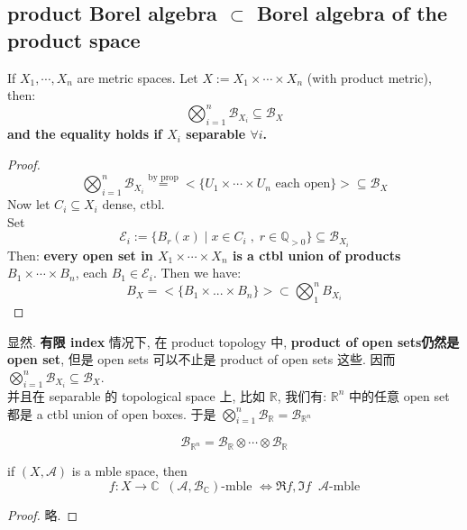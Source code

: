 \documentclass[lang=cn,11pt]{elegantbook}
\begin{document}
\subsection{product Borel algebra $\subset$ Borel algebra of the product space}
\begin{proposition}
    If $X_1,\cdots, X_n $ are metric spaces. Let $X := X_1 \times \cdots \times X_n$ (with product metric), then: $$\bigotimes_{i=1}^n \mathcal{B}_{X_i} \subseteq \mathcal{B}_X$$
\textbf{and the equality holds if $X_i$ separable $\forall i$.}
\end{proposition}
\begin{proof}
   $$\bigotimes_{i=1}^n \mathcal{B}_{X_i}  \overset{\text{by prop}}{=} < \{ U_1\times \cdots \times U_n  \text{ each open} \} > \subseteq\mathcal{B}_X $$
   Now let $C_i \subseteq X_i$ dense, ctbl. \\
   Set $$\mathcal{E}_i  := \{  B_r(x) \mid x\in C_i \;,\; r\in \mathbb{Q}_{>0}  \} \subseteq \mathcal{B}_{X_i} $$
   Then: \textbf{every open set in $X_1 \times \cdots \times X_n$ is a ctbl union of products $B_1 \times \cdots \times B_n$}, each $B_1 \in \mathcal{E}_i$.
   Then we have: $$B_X = <\{B_1 \times ...\times B_n\}> \subset \bigotimes_1^n B_{X_i}$$
\end{proof}
\begin{remark}
    显然. \textbf{有限 index} 情况下, 在 product topology 中, \textbf{product of open sets仍然是 open set}, 但是 open sets 可以不止是 product of open sets 这些. 因而 \(\bigotimes_{i=1}^n \mathcal{B}_{X_i} \subseteq \mathcal{B}_X\). \\
 并且在 separable 的 topological space 上, 比如 $\mathbb{R}$, 我们有: $\mathbb{R}^n$ 中的任意 open set 都是 a ctbl union of open boxes. 于是 \(\bigotimes_{i=1}^n \mathcal{B}_{\mathbb{R}}  = \mathcal{B}_{\mathbb{R}^n}\)
\end{remark}

\begin{example}
    $$\mathcal{B}_{\mathbb{R}^n} = \mathcal{B}_{\mathbb{R}} \otimes \cdots \otimes \mathcal{B}_{\mathbb{R}}$$
\end{example}


\begin{corollary}
    if $(X,\mathcal{A})$ is a mble space, then $$f:X\rightarrow \mathbb{C}  \;\;(\mathcal{A},\mathcal{B}_{\mathbb{C}})\text{-mble } \Longleftrightarrow \Re f, \Im f \;\;\mathcal{A}\text{-mble}$$
\end{corollary}
\begin{proof}
    略.
\end{proof}
\end{document}
